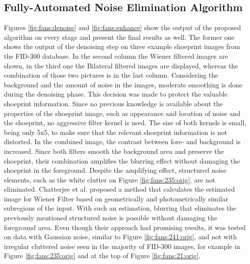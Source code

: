 \documentclass[draft,final]{vutinfth} %
\begin{document}
\subsection{Fully-Automated Noise Elimination Algorithm}
\par
Figures \ref{fig:fans:denoise} and \ref{fig:fans:enhance} show the output of the proposed algorithm on every stage and present the final results as well.
The former one shows the output of the denoising step on three example shoeprint images from the FID-300 database.
In the second column the Wiener filtered images are shown, in the third one the Bilateral filtered images are displayed, whereas the combination of those two pictures is in the last column.
Considering the background and the amount of noise in the images, moderate smoothing is done during the denoising phase.
This decision was made to protect the valuable shoeprint information.
Since no previous knowledge is available about the properties of the shoeprint image, such as appearance and location of noise and the shoeprint, no aggressive filter kernel is used.
The  size of both kernels is small, being only 5x5, to make sure that the relevant shoeprint information is not distorted.
In the combined image, the contrast between fore- and background is increased.
Since both filters smooth the background area and preserve the shoeprint, their combination amplifies the blurring effect without damaging the shoeprint in the foreground. 
Despite the amplifying effect, structured noise elements, such as the white clutter on Figure \ref{fig:fans:235:orig}, are not eliminated.  
Chatterjee et al. \cite{chatterjee2011patch} proposed a method that calculates the estimated image for Wiener Filter based on geometrically and photometrically similar subregions of the input.
With such an estimation, blurring that eliminates the previously mentioned structured noise is possible without damaging the foreground area.
Even though their approach had promising results, it was tested on data with Gaussian noise, similar to Figure \ref{fig:fans:241:orig}, and not with irregular cluttered noise seen in the majority of FID-300 images, for example in Figure \ref{fig:fans:235:orig} and at the top of Figure \ref{fig:fans:21:orig}.
\end{document}
